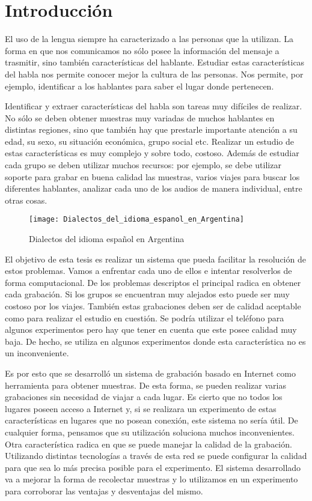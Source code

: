 
\chapter{Introducción}

El uso de la lengua siempre ha caracterizado a las personas que la utilizan. La forma en que nos comunicamos no sólo posee la información del mensaje a trasmitir, sino también características del hablante. Estudiar estas características del habla nos permite conocer mejor la cultura de las personas. Nos permite, por ejemplo, identificar a los hablantes para saber el lugar donde pertenecen.

Identificar y extraer características del habla son tareas muy difíciles de realizar. No sólo se deben obtener muestras muy variadas de muchos hablantes en distintas regiones, sino que también hay que prestarle importante atención a su edad, su sexo, su situación económica, grupo social etc. Realizar un estudio de estas características es muy complejo y sobre todo, costoso. Además de estudiar cada grupo se deben utilizar muchos recursos: por ejemplo, se debe utilizar soporte para grabar en buena calidad las muestras, varios viajes para buscar los diferentes hablantes, analizar cada uno de los audios de manera individual, entre otras cosas. 

\begin{figure}[h!]
	\centering
    \texttt{[image: Dialectos\_del\_idioma\_espanol\_en\_Argentina]} 
    \caption{Dialectos del idioma español en Argentina}
    \label{fig11}
\end{figure}

El objetivo de esta tesis es realizar un sistema que pueda facilitar la resolución de estos problemas. Vamos a enfrentar cada uno de ellos e intentar resolverlos de forma computacional. De los problemas descriptos el principal radica en obtener cada grabación. Si los grupos se encuentran muy alejados esto puede ser muy costoso por los viajes. También estas grabaciones deben ser de calidad aceptable como para realizar el estudio en cuestión. Se podría utilizar el teléfono para algunos experimentos pero hay que tener en cuenta que este posee calidad muy baja. De hecho, se utiliza en algunos experimentos donde esta característica no es un inconveniente. 

Es por esto que se desarrolló un sistema de grabación basado en Internet como herramienta para obtener muestras. De esta forma, se pueden realizar varias grabaciones sin necesidad de viajar a cada lugar. Es cierto que no todos los lugares poseen acceso a Internet y, si se realizara un experimento de estas características en lugares que no posean conexión, este sistema no sería útil. De cualquier forma, pensamos que su utilización soluciona muchos inconvenientes. Otra característica radica en que se puede manejar la calidad de la grabación. Utilizando distintas tecnologías a través de esta red se puede configurar la calidad para que sea lo más precisa posible para el experimento. El sistema desarrollado va a mejorar la forma de recolectar muestras y lo utilizamos en un experimento para corroborar las ventajas y desventajas del mismo.

